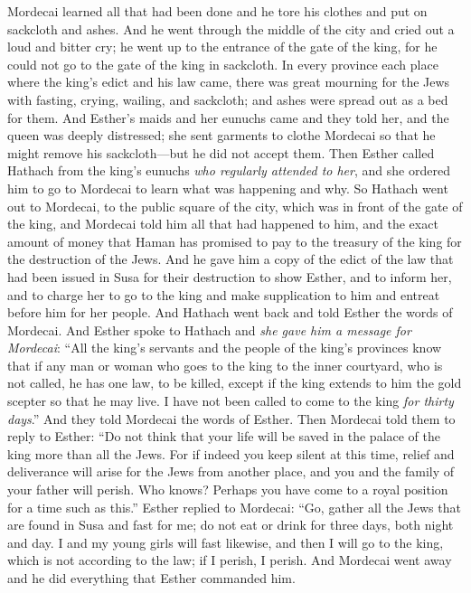 \begin{biblechapter} %
 Mordecai learned all that had been done and he tore his clothes and put on sackcloth and ashes. And he went through the middle of the city and cried out a loud and bitter cry;
\verse he went up to the entrance of the gate of the king, for he could not go to the gate of the king in sackcloth.
\verse In every province each place where the king’s edict and his law came, there was great mourning for the Jews with fasting, crying, wailing, and sackcloth; and ashes were spread out as a bed for them.
\verse And Esther’s maids and her eunuchs came and they told her, and the queen was deeply distressed; she sent garments to clothe Mordecai so that he might remove his sackcloth—but he did not accept them.
\verse Then Esther called Hathach from the king’s eunuchs \textit{who regularly attended to her}, and she ordered him to go to Mordecai to learn what was happening and why.
\verse So Hathach went out to Mordecai, to the public square of the city, which was in front of the gate of the king,
\verse and Mordecai told him all that had happened to him, and the exact amount of money that Haman has promised to pay to the treasury of the king for the destruction of the Jews.
\verse And he gave him a copy of the edict of the law that had been issued in Susa for their destruction to show Esther, and to inform her, and to charge her to go to the king and make supplication to him and entreat before him for her people.
\verse And Hathach went back and told Esther the words of Mordecai.
\verse And Esther spoke to Hathach and \textit{she gave him a message for Mordecai}:
\verse “All the king’s servants and the people of the king’s provinces know that if any man or woman who goes to the king to the inner courtyard, who is not called, he has one law, to be killed, except if the king extends to him the gold scepter so that he may live. I have not been called to come to the king \textit{for thirty days}.”
\verse And they told Mordecai the words of Esther.
\verse Then Mordecai told them to reply to Esther: “Do not think that your life will be saved in the palace of the king more than all the Jews.
\verse For if indeed you keep silent at this time, relief and deliverance will arise for the Jews from another place, and you and the family of your father will perish. Who knows? Perhaps you have come to a royal position for a time such as this.”
\verse Esther replied to Mordecai:
\verse “Go, gather all the Jews that are found in Susa and fast for me; do not eat or drink for three days, both night and day. I and my young girls will fast likewise, and then I will go to the king, which is not according to the law; if I perish, I perish.
\verse And Mordecai went away and he did everything that Esther commanded him.
\end{biblechapter}

